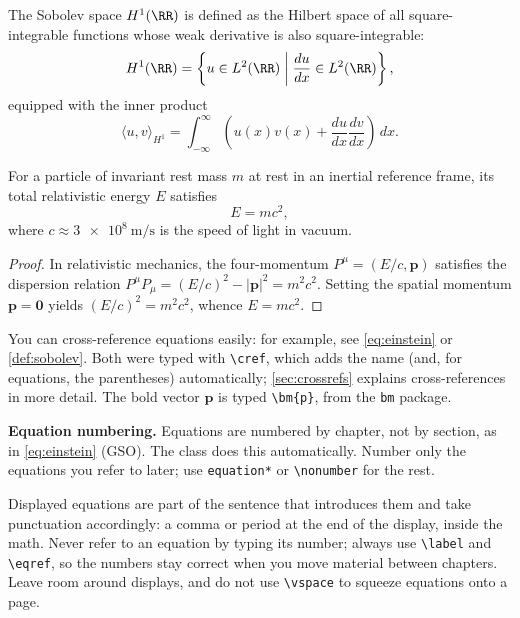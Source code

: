 \begin{definition}
\label{def:sobolev}
The Sobolev space $H^1(\RR)$ is defined as the Hilbert space of all square-integrable functions whose weak derivative is also square-integrable:
\begin{equation}
\label{eq:sobolev}
H^1(\RR) = \left\{ u \in L^2(\RR) \;\middle|\; \frac{du}{dx} \in L^2(\RR) \right\},
\end{equation}
equipped with the inner product
\begin{equation}
\label{eq:innerprod}
\langle u, v \rangle_{H^1} = \int_{-\infty}^{\infty} \left( u(x)v(x) + \frac{du}{dx}\frac{dv}{dx} \right) \, dx.
\end{equation}
\end{definition}

\begin{theorem}
\label{thm:einstein}
For a particle of invariant rest mass $m$ at rest in an inertial reference frame, its total relativistic energy $E$ satisfies
\begin{equation}
\label{eq:einstein}
E = m c^2,
\end{equation}
where $c \approx \qty{3e8}{\metre\per\second}$ is the speed of light in vacuum.
\end{theorem}

\begin{proof}
In relativistic mechanics, the four-momentum $P^\mu = (E/c, \bm{p})$ satisfies the dispersion relation $P^\mu P_\mu = (E/c)^2 - |\bm{p}|^2 = m^2 c^2$. Setting the spatial momentum $\bm{p} = \bm{0}$ yields $(E/c)^2 = m^2 c^2$, whence $E = mc^2$.
\end{proof}

You can cross-reference equations easily: for example, see \cref{eq:einstein} or \cref{def:sobolev}. Both were typed with \verb+\cref+, which adds the name (and, for equations, the parentheses) automatically; \cref{sec:crossrefs} explains cross-references in more detail. The bold vector $\bm{p}$ is typed \verb+\bm{p}+, from the \texttt{bm} package.

\textbf{Equation numbering.} Equations are numbered by chapter, not by section, as in \cref{eq:einstein} (GSO). The class does this automatically. Number only the equations you refer to later; use \verb+equation*+ or \verb+\nonumber+ for the rest.

Displayed equations are part of the sentence that introduces them and take punctuation accordingly: a comma or period at the end of the display, inside the math. Never refer to an equation by typing its number; always use \verb+\label+ and \verb+\eqref+, so the numbers stay correct when you move material between chapters. Leave room around displays, and do not use \verb+\vspace+ to squeeze equations onto a page.

